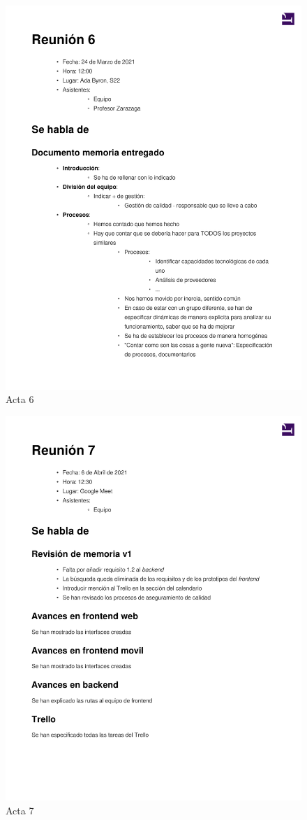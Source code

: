 \documentclass{article}
\begin{document}
\begin{figure}
   \includegraphics[width=.8\textwidth]{../../actas_reuniones/acta6.pdf}
   \caption{Acta 6}
\end{figure}
\begin{figure}
   \includegraphics[width=.8\textwidth]{../../actas_reuniones/acta7.pdf}
   \caption{Acta 7}
\end{figure}
\end{document}

